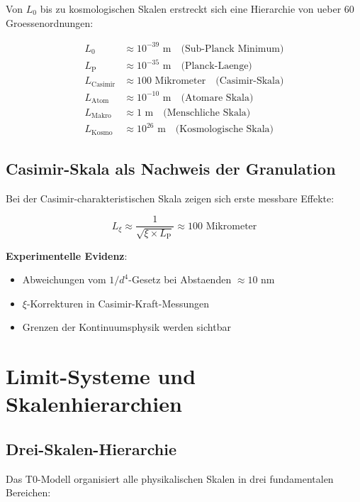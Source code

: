 \documentclass[12pt,a4paper]{article}
\newcommand{\xipar}{\xi}
\newcommand{\Lzero}{L_0}
\newcommand{\Lp}{L_{\text{P}}}
\theoremstyle{definition}
\theoremstyle{remark}
\begin{document}
	Von $\Lzero$ bis zu kosmologischen Skalen erstreckt sich eine Hierarchie von ueber 60 Groessenordnungen:
	
	\begin{align}
		\Lzero &\approx 10^{-39} \text{ m} \quad \text{(Sub-Planck Minimum)} \\
		\Lp &\approx 10^{-35} \text{ m} \quad \text{(Planck-Laenge)} \\
		L_{\text{Casimir}} &\approx 100 \text{ Mikrometer} \quad \text{(Casimir-Skala)} \\
		L_{\text{Atom}} &\approx 10^{-10} \text{ m} \quad \text{(Atomare Skala)} \\
		L_{\text{Makro}} &\approx 1 \text{ m} \quad \text{(Menschliche Skala)} \\
		L_{\text{Kosmo}} &\approx 10^{26} \text{ m} \quad \text{(Kosmologische Skala)}
	\end{align}
	
	\subsection{Casimir-Skala als Nachweis der Granulation}
	
	Bei der Casimir-charakteristischen Skala zeigen sich erste messbare Effekte:
	
	\begin{equation}
		L_{\xipar} \approx \frac{1}{\sqrt{\xipar \times \Lp}} \approx 100 \text{ Mikrometer}
	\end{equation}
	
	\textbf{Experimentelle Evidenz}:
	\begin{itemize}
		\item Abweichungen vom $1/d^4$-Gesetz bei Abstaenden $\approx 10$ nm
		\item $\xipar$-Korrekturen in Casimir-Kraft-Messungen
		\item Grenzen der Kontinuumsphysik werden sichtbar
	\end{itemize}
	
	\section{Limit-Systeme und Skalenhierarchien}
	
	\subsection{Drei-Skalen-Hierarchie}
	
	Das T0-Modell organisiert alle physikalischen Skalen in drei fundamentalen Bereichen:
	
\end{document}
